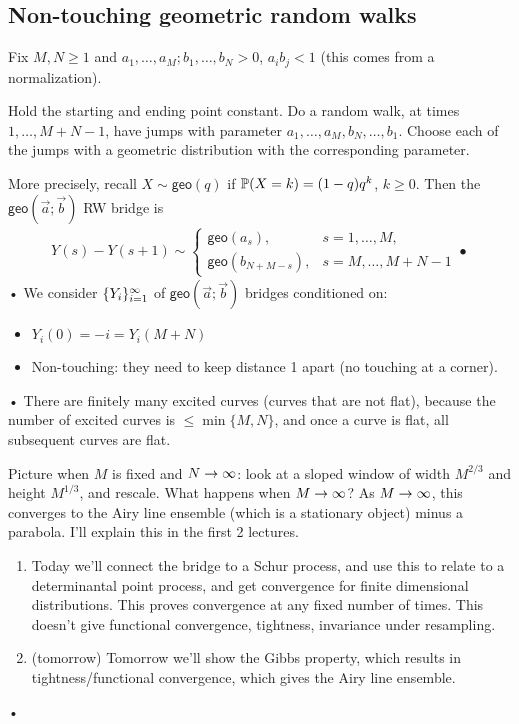
\subsection{Non-touching geometric random walks}

Fix $M,N\ge 1$ and $a_1,\ldots, a_M;b_1,\ldots, b_N>0$, $a_ib_j<1$ (this comes from a normalization).

Hold the starting and ending point constant. 
Do a random walk, at times $1,\ldots, M+N-1$, have jumps with parameter $a_1,\ldots, a_M,b_N,\ldots, b_1$. Choose each of the jumps with a geometric distribution with the corresponding parameter.

More precisely, recall $X\sim \mathsf{geo}(q)$ if $\mathbb{P}(X=k)=(1-q)q^k$, $k\ge 0$. Then the $\mathsf{geo}(\vec a;\vec b)$ RW bridge is 
\begin{align*}
Y(s)-Y(s+1)\sim \begin{cases}
\mathsf{geo}(a_s),&s=1,\ldots, M,\\
\mathsf{geo}(b_{N+M-s}),&s=M,\ldots, M+N-1
\end{cases}•
\end{align*}•
We consider $\{Y_i\}_{i=1}^\infty$ of $\mathsf{geo}(\vec a;\vec b)$ bridges conditioned on:
\begin{itemize}
\item
$Y_i(0)=-i=Y_i(M+N)$
\item
Non-touching: they need to keep distance 1 apart (no touching at a corner).
\end{itemize}•
There are finitely many excited curves (curves that are not flat), because the number of excited curves is $\le \min\{M,N\}$, and once a curve is flat, all subsequent curves are flat.

Picture when $M$ is fixed and $N\to \infty$: look at a sloped window of width $M^{2/3}$ and height $M^{1/3}$, and rescale. What happens when $M\to \infty$? As $M\to \infty$, this converges to the Airy line ensemble (which is a stationary object) minus a parabola. I'll explain this in the first 2 lectures.

\begin{enumerate}
\item
Today we'll connect the bridge to a Schur process, and use this to relate to a determinantal point process, and get convergence for finite dimensional distributions. This proves convergence at any fixed number of times. This doesn't give functional convergence, tightness, invariance under resampling.
\item (tomorrow)
Tomorrow we'll show the Gibbs property, which results in tightness/functional convergence, which gives the Airy line ensemble.
\end{enumerate}•

